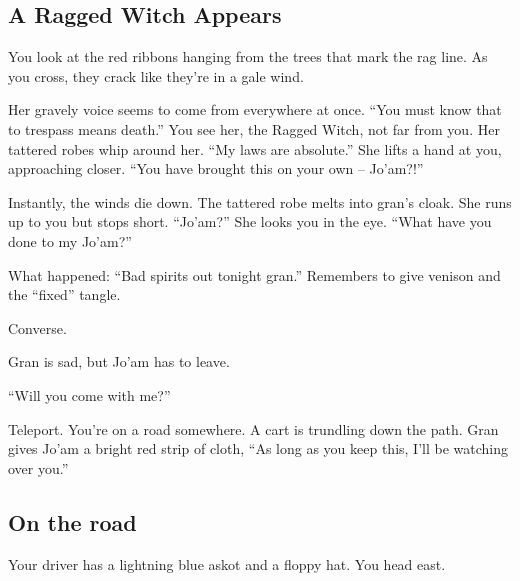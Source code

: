 \begin{multicols}{2}
  \subsection{A Ragged Witch Appears}\label{subsec:scene:ARaggedWitchAppears}

  \begin{aloud}
  You look at the red ribbons hanging from the trees that mark the rag line.
  As you cross, they crack like they're in a gale wind.

  Her gravely voice seems to come from everywhere at once.
  ``You must know that to trespass means death.''
  You see her, the Ragged Witch, not far from you.
  Her tattered robes whip around her.
  ``My laws are absolute.''
  She lifts a hand at you, approaching closer.
  ``You have brought this on your own --
    Jo'am?!''

  Instantly, the winds die down.
  The tattered robe melts into gran's cloak.
  She runs up to you but stops short.
  ``Jo'am?''
  She looks you in the eye.
  ``What have you done to my Jo'am?''
  \end{aloud}

  \begin{aloud}
    What happened:
    ``Bad spirits out tonight gran.''
    Remembers to give venison and the ``fixed'' tangle.
  \end{aloud}


  Converse.

Gran is sad, but Jo'am has to leave.

``Will you come with me?''

Teleport.
You're on a road somewhere.
A cart is trundling down the path.
Gran gives Jo'am a bright red strip of cloth,
``As long as you keep this, I'll be watching over you.''

\subsection{On the road}\label{subsec:scene:OnTheRoad}
  Your driver has a lightning blue askot and a floppy hat.
  You head east.
\end{multicols}
